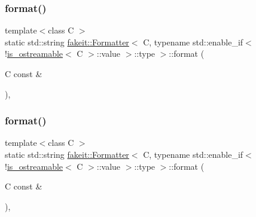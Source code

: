\subsubsection{\texorpdfstring{format()}{format()}\hspace{0.1cm}{\footnotesize\ttfamily [2/9]}}
{\footnotesize\ttfamily template$<$class C $>$ \\
static std\+::string \mbox{\hyperlink{structfakeit_1_1Formatter}{fakeit\+::\+Formatter}}$<$ C, typename std\+::enable\+\_\+if$<$!\mbox{\hyperlink{classfakeit_1_1is__ostreamable}{is\+\_\+ostreamable}}$<$ C $>$\+::value $>$\+::type $>$\+::format (\begin{DoxyParamCaption}\item[{C const \&}]{ }\end{DoxyParamCaption})\hspace{0.3cm}{\ttfamily [inline]}, {\ttfamily [static]}}

\mbox{\label{structfakeit_1_1Formatter_3_01C_00_01typename_01std_1_1enable__if_3_9is__ostreamable_3_01C_01_4_1_1value_01_4_1_1type_01_4_a4dba58e2321b020a9ac60d5e132afbb0}} 
\subsubsection{\texorpdfstring{format()}{format()}\hspace{0.1cm}{\footnotesize\ttfamily [3/9]}}
{\footnotesize\ttfamily template$<$class C $>$ \\
static std\+::string \mbox{\hyperlink{structfakeit_1_1Formatter}{fakeit\+::\+Formatter}}$<$ C, typename std\+::enable\+\_\+if$<$!\mbox{\hyperlink{classfakeit_1_1is__ostreamable}{is\+\_\+ostreamable}}$<$ C $>$\+::value $>$\+::type $>$\+::format (\begin{DoxyParamCaption}\item[{C const \&}]{ }\end{DoxyParamCaption})\hspace{0.3cm}{\ttfamily [inline]}, {\ttfamily [static]}}

